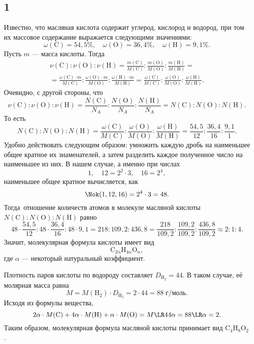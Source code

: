 \subsection{1}

Известно, что масляная кислота содержит углерод, кислород и водород, при том их массовое содержание выражается следующими значениями:
\[
\omega(\mathrm{C})=54{,}5\%,\quad\omega(\mathrm{O})=36{,}4\%,\quad\omega(\mathrm{H})=9{,}1\%.
\]
Пусть $m$ --- масса кислоты. Тогда
\begin{multline*}
\nu(\mathrm{C}):\nu(\mathrm{O}):\nu(\mathrm{H})=\frac{m(\mathrm{C})}{M(\mathrm{C})}:\frac{m(\mathrm{O})}{M(\mathrm{O})}:\frac{m(\mathrm{H})}{M(\mathrm{H})}= \\
=\frac{\omega(\mathrm{C})\cdot m}{M(\mathrm{C})}:\frac{\omega(\mathrm{O})\cdot m}{M(\mathrm{O})}:\frac{\omega(\mathrm{H})\cdot m}{M(\mathrm{H})}=\frac{\omega(\mathrm{C})}{M(\mathrm{C})}:\frac{\omega(\mathrm{O})}{M(\mathrm{O})}:\frac{\omega(\mathrm{H})}{M(\mathrm{H})}.
\end{multline*}
Очевидно, с другой стороны, что
\[
\nu(\mathrm{C}):\nu(\mathrm{O}):\nu(\mathrm{H})=\frac{N(\mathrm{C})}{N_A}:\frac{N(\mathrm{O})}{N_A}:\frac{N(\mathrm{H})}{N_A}=N(\mathrm{C}):N(\mathrm{O}):N(\mathrm{H}).
\]
То есть
\[
N(\mathrm{C}):N(\mathrm{O}):N(\mathrm{H})=\frac{\omega(\mathrm{C})}{M(\mathrm{C})}:\frac{\omega(\mathrm{O})}{M(\mathrm{O})}:\frac{\omega(\mathrm{H})}{M(\mathrm{H})}=\frac{54{,}5}{12}:\frac{36{,}4}{16}:\frac{9{,}1}{1}.
\]
Удобно действовать следующим образом: умножить каждую дробь на наименьшее общее кратное их знаменателей, а затем разделить каждое полученное число на наименьшее из них. В нашем случае, а именно при числах
\[
1,\quad12=2^2\cdot3,\quad16=2^4,
\]
наименьшее общее кратное вычисляется, как
\[
\Nok(1,12,16)=2^4\cdot3=48.
\]
Тогда~отношение количеств атомов в молекуле масляной кислоты $N(\mathrm{C}):N(\mathrm{O}):N(\mathrm{H})$ равно
\[
48\cdot\frac{54{,}5}{12}:48\cdot\frac{36{,}4}{16}:48\cdot9{,}1=218:109{,}2:436{,}8=\frac{218}{109{,}2}:\frac{109{,}2}{109{,}2}:\frac{436{,}8}{109{,}2}\approx2:1:4.
\]
Значит, молекулярная формула кислоты имеет вид
\[
\mathrm{C_{2\alpha}H_{4\alpha}O_{\alpha}},
\]
где $\alpha$ --- некоторый натуральный коэффициент.

Плотность паров кислоты по водороду составляет $D_{\mathrm{H_2}}=44$. В таком случае, её молярная масса равна
\[
M=M(\mathrm{H_2})\cdot D_{\mathrm{H_2}}=2\cdot44=88\;\text{г/моль}.
\]
Исходя из формулы вещества,
\[
2\alpha\cdot M(\mathrm{C})+4\alpha\cdot M(\mathrm{H})+\alpha\cdot M(\mathrm{O})=M\LR 44\alpha=88\LR\alpha=2.
\]
Таким образом, молекулярная формула масляной кислоты принимает вид $\mathrm{C_4H_8O_2}$.